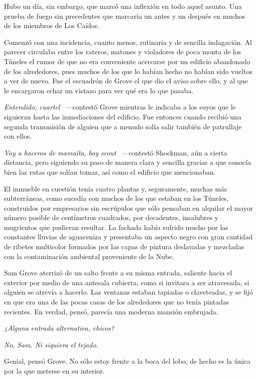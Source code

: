 Hubo un día, sin embargo, que marcó una inflexión en todo aquel asunto. Una prueba de fuego sin precedentes que marcaría un antes y un después en muchos de los miembros de Los Caídos.

Comenzó con una incidencia, cuanto menos, rutinaria y de sencilla indagación. Al parecer circulaba entre los rateros, matones y violadores de poca monta de los Túneles el rumor de que no era conveniente acercarse por un edificio abandonado de los alrededores, pues muchos de los que lo habían hecho no habían sido vueltos a ver de nuevo. Fue el escuadrón de Grove el que dio el aviso sobre ello, y al que le encargaron echar un vistazo para ver qué era lo que pasaba.

\emph{Entendido, cuartel} ~---contestó Grove mientras le indicaba a los suyos que le siguieran hasta las inmediaciones del edificio. Fue entonces cuando recibió una segunda transmisión de alguien que a menudo solía salir también de patrullaje con ellos.

\emph{Voy a haceros de mamaíta, boy scout} ~---contestó Shockman, aún a cierta distancia, pero siguiendo su paso de manera clara y sencilla gracias a que conocía bien las rutas que solían tomar, así como el edificio que mencionaban.

El inmueble en cuestión tenía cuatro plantas y, seguramente, muchas más subterráneas, como sucedía con muchos de los que estaban en los Túneles, construidos por empresarios sin escrúpulos que sólo pensaban en alquilar el mayor número posible de centímetros cuadrados, por decadentes, insalubres y mugrientos que pudieran resultar. La fachada había sufrido mucho por las constantes lluvias de aguaceniza y presentaba un aspecto negro con gran cantidad de ribetes multicolor formados por las capas de pintura deslavadas y mezcladas con la contaminación ambiental proveniente de la Nube.

Sam Grove aterrizó de un salto frente a su misma entrada, saliente hacia el exterior por medio de una antesala cubierta, como si invitara a ser atravesada, si alguien se atrevía a hacerlo. Las ventanas estaban tapiadas o claveteadas, y se fijó en que era una de las pocas casas de los alrededores que no tenía pintadas recientes. En verdad, pensó, parecía una moderna mansión embrujada.

\emph{¿Alguna entrada alternativa, chicos?}

\emph{No, Sam. Ni siquiera el tejado.}

Genial, pensó Grove. No sólo estoy frente a la boca del lobo, de hecho es la única por la que meterse en su interior.

